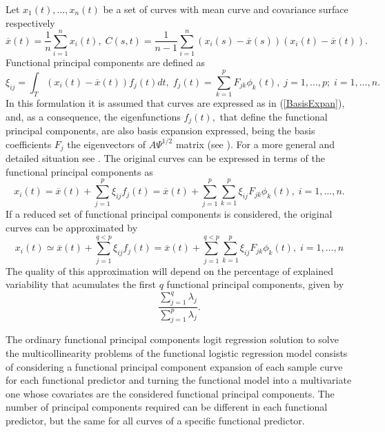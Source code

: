 Let $x_{1}\left( t\right) ,\ldots ,x_{n}\left( t\right) $ be a set of curves with mean curve and covariance surface respectively
\begin{equation*}
\overline{x}\left( t\right) =\dfrac{1}{n}\sum_{i=1}^{n}x_{i}\left( t\right), \; C\left( s,t\right) =\dfrac{1}{n-1}\sum_{i=1}^{n}\left( x_{i}\left(
s\right) -\overline{x}\left( s\right) \right) \left( x_{i}\left( t\right) -%
\overline{x}\left( t\right) \right).
\end{equation*}
Functional principal components are defined as
\begin{equation*}
\xi _{ij}=\int_{T}\left(x_{i}\left( t\right)-\overline{x}\left( t\right) \right) f_j\left( t\right) dt, \; f_{j}\left( t\right) =\sum_{k=1}^{p}F_{jk}\phi _{k}\left( t\right), \;  j=1,\ldots,p; \; i=1,\ldots,n.
\end{equation*}
In this formulation it is assumed that curves are expressed as in (\ref{BasisExpan}), and, as a consequence, the eigenfunctions $f_j(t),$ that define the functional principal components, are also basis expansion expressed, being the basis coefficients $F_j$ the eigenvectors of $A\Psi^{1/2}$ matrix (see \cite{Ocana2007}). For a more general and detailed situation see \cite{Ramsay05}. The original curves can be expressed in terms of the functional principal components as
\begin{equation*}
x_{i}\left( t\right) =\overline{x}(t)+\sum_{j=1}^{p }\xi _{ij}f_{j}\left( t\right)=\overline{x}(t)+\sum_{j=1}^{p } \sum_{k=1}^{p} \xi _{ij} F_{jk}\phi _{k}\left( t\right),\;i=1,\ldots ,n.
\end{equation*}
If a reduced set of functional principal components is considered, the original curves can be approximated by
\begin{equation}
x_{i}\left( t\right) \simeq \overline{x}(t) + \sum_{j=1}^{q<p }\xi _{ij}f_{j}\left( t\right)=\overline{x}(t)+\sum_{j=1}^{q<p } \sum_{k=1}^{p} \xi _{ij} F_{jk}\phi _{k}\left( t\right),\;i=1,\ldots ,n \label{FPCA}
\end{equation}
The quality of this approximation will depend on the percentage of explained variability that acumulates the first $q$ functional principal components, given by 
\begin{equation*}
\dfrac{\sum_{j=1}^q \lambda_j}{\sum_{j=1}^p \lambda_j}.
\end{equation*}

The ordinary functional principal components logit regression solution to solve the multicollinearity problems of the functional logistic regression model consists of considering a functional principal component expansion of each sample curve for each functional predictor and turning the functional model into a multivariate one whose covariates are the considered functional principal components. The number of principal components required can be different in each functional predictor, but the same for all curves of a specific functional predictor.

